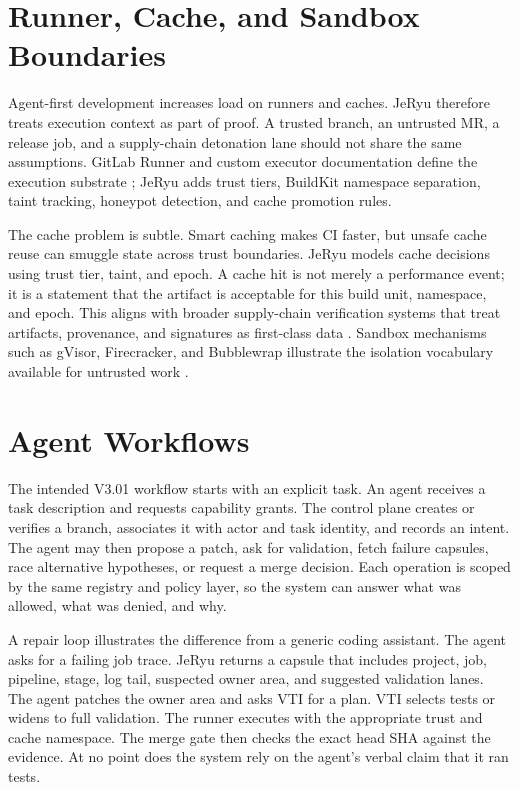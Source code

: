 \documentclass[conference]{IEEEtran}
\begin{document}
\section{Runner, Cache, and Sandbox Boundaries}
Agent-first development increases load on runners and caches. JeRyu therefore treats execution context as part of proof. A trusted branch, an untrusted MR, a release job, and a supply-chain detonation lane should not share the same assumptions. GitLab Runner and custom executor documentation define the execution substrate \cite{gitlab-runners-docs,gitlab-custom-executor}; JeRyu adds trust tiers, BuildKit namespace separation, taint tracking, honeypot detection, and cache promotion rules.

The cache problem is subtle. Smart caching makes CI faster, but unsafe cache reuse can smuggle state across trust boundaries. JeRyu models cache decisions using trust tier, taint, and epoch. A cache hit is not merely a performance event; it is a statement that the artifact is acceptable for this build unit, namespace, and epoch. This aligns with broader supply-chain verification systems that treat artifacts, provenance, and signatures as first-class data \cite{slsa,in-toto,sigstore,rustsec}. Sandbox mechanisms such as gVisor, Firecracker, and Bubblewrap illustrate the isolation vocabulary available for untrusted work \cite{gvisor,firecracker,bubblewrap}.

\section{Agent Workflows}
The intended V3.01 workflow starts with an explicit task. An agent receives a task description and requests capability grants. The control plane creates or verifies a branch, associates it with actor and task identity, and records an intent. The agent may then propose a patch, ask for validation, fetch failure capsules, race alternative hypotheses, or request a merge decision. Each operation is scoped by the same registry and policy layer, so the system can answer what was allowed, what was denied, and why.

A repair loop illustrates the difference from a generic coding assistant. The agent asks for a failing job trace. JeRyu returns a capsule that includes project, job, pipeline, stage, log tail, suspected owner area, and suggested validation lanes. The agent patches the owner area and asks VTI for a plan. VTI selects tests or widens to full validation. The runner executes with the appropriate trust and cache namespace. The merge gate then checks the exact head SHA against the evidence. At no point does the system rely on the agent's verbal claim that it ran tests.
\end{document}
